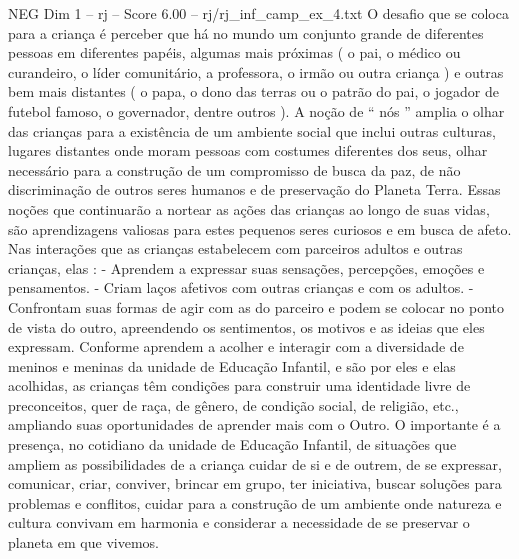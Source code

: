 \begin{textsample}{NEG Dim 1 – rj – Score 6.00 – rj/rj\_inf\_camp\_ex\_4.txt}
O desafio que se coloca para a criança é perceber que há no mundo um conjunto grande de diferentes pessoas em diferentes papéis, algumas mais próximas ( o pai, o médico ou curandeiro, o líder comunitário, a professora, o irmão ou outra criança ) e outras bem mais distantes ( o papa, o dono das terras ou o patrão do pai, o jogador de futebol famoso, o governador, dentre outros ).
A noção de “ nós ” amplia o olhar das crianças para a existência de um ambiente social que inclui outras culturas, lugares distantes onde moram pessoas com costumes diferentes dos seus, olhar necessário para a construção de um compromisso de busca da paz, de não discriminação de outros seres humanos e de preservação do Planeta Terra.
Essas noções que continuarão a nortear as ações das crianças ao longo de suas vidas, são aprendizagens valiosas para estes pequenos seres curiosos e em busca de afeto.
Nas interações que as crianças estabelecem com parceiros adultos e outras crianças, elas : - Aprendem a expressar suas sensações, percepções, emoções e pensamentos. - Criam laços afetivos com outras crianças e com os adultos. - Confrontam suas formas de agir com as do parceiro e podem se colocar no ponto de vista do outro, apreendendo os sentimentos, os motivos e as ideias que eles expressam.
Conforme aprendem a acolher e interagir com a diversidade de meninos e meninas da unidade de Educação Infantil, e são por eles e elas acolhidas, as crianças têm condições para construir uma identidade livre de preconceitos, quer de raça, de gênero, de condição social, de religião, etc., ampliando suas oportunidades de aprender mais com o Outro.
O importante é a presença, no cotidiano da unidade de Educação Infantil, de situações que ampliem as possibilidades de a criança cuidar de si e de outrem, de se expressar, comunicar, criar, conviver, brincar em grupo, ter iniciativa, buscar soluções para problemas e conflitos, cuidar para a construção de um ambiente onde natureza e cultura convivam em harmonia e considerar a necessidade de se preservar o planeta em que vivemos.

\end{textsample}
